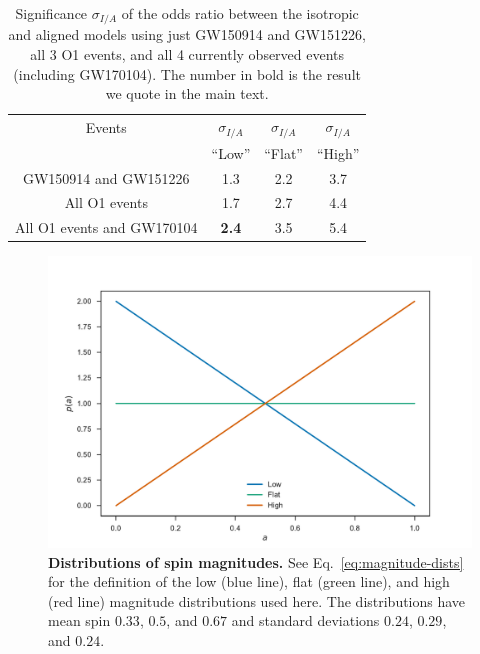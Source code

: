 \documentclass{nature-arxiv}
\begin{document}
\begin{methods}
\begin{thebibliography}{10}
\end{thebibliography}

\newpage

\begin{table}
\begin{centering}
\begin{tabular}{ c |  c  |  c  | c  }
  \hline 
  \hline
Events & $\sigma_{I/A}$ &  $\sigma_{I/A}$ & $\sigma_{I/A}$ \\ 
 & ``Low'' & ``Flat'' & ``High'' \\ \hline
GW150914 and GW151226 &  1.3 & 2.2 & 3.7 \\ %
All O1 events & 1.7 & 2.7 & 4.4 \\ %
All O1 events and GW170104 & \textbf{2.4} & 3.5 & 5.4 \\ \hline
\end{tabular}
\caption[]{Significance $\sigma_{I/A}$ of the odds ratio between the isotropic and aligned models using just GW150914 and GW151226, all 3 O1 events, and all 4 currently observed events (including GW170104). The number in bold is the result we quote in the main text.}
\label{tab:accumulation}
\end{centering}
\end{table}

\newpage

\begin{figure}
  \includegraphics[width=\columnwidth]{../plots/pa}
  \caption{\textbf{Distributions of spin magnitudes.}  See Eq.\
    \eqref{eq:magnitude-dists} for the definition of the low (blue
    line), flat (green line), and high (red line) magnitude
    distributions used here.  The distributions have mean spin $0.33$,
    $0.5$, and $0.67$ and standard deviations $0.24$, $0.29$, and
    $0.24$.}
  \label{fig:pa}
\end{figure}


\end{methods}
\end{document}
